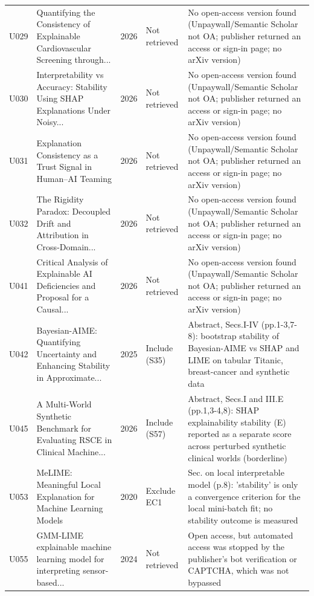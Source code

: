 \begin{longtable}{@{}P{1.0cm}P{6.3cm}P{0.7cm}P{1.6cm}P{6.1cm}@{}}
U029 & Quantifying the Consistency of Explainable Cardiovascular Screening through... & 2026 & Not retrieved & No open-access version found (Unpaywall/\allowbreak{}Semantic Scholar not OA; publisher returned an access or sign-in page; no arXiv version) \\
U030 & Interpretability vs Accuracy: Stability Using SHAP Explanations Under Noisy... & 2026 & Not retrieved & No open-access version found (Unpaywall/\allowbreak{}Semantic Scholar not OA; publisher returned an access or sign-in page; no arXiv version) \\
U031 & Explanation Consistency as a Trust Signal in Human--AI Teaming & 2026 & Not retrieved & No open-access version found (Unpaywall/\allowbreak{}Semantic Scholar not OA; publisher returned an access or sign-in page; no arXiv version) \\
U032 & The Rigidity Paradox: Decoupled Drift and Attribution in Cross-Domain... & 2026 & Not retrieved & No open-access version found (Unpaywall/\allowbreak{}Semantic Scholar not OA; publisher returned an access or sign-in page; no arXiv version) \\
U041 & Critical Analysis of Explainable AI Deficiencies and Proposal for a Causal... & 2026 & Not retrieved & No open-access version found (Unpaywall/\allowbreak{}Semantic Scholar not OA; publisher returned an access or sign-in page; no arXiv version) \\
U042 & Bayesian-AIME: Quantifying Uncertainty and Enhancing Stability in Approximate... & 2025 & Include (S35) & Abstract, Secs.I-IV (pp.1-3,7-8): bootstrap stability of Bayesian-AIME vs SHAP and LIME on tabular Titanic, breast-cancer and synthetic data \\
U045 & A Multi-World Synthetic Benchmark for Evaluating RSCE in Clinical Machine... & 2026 & Include (S57) & Abstract, Secs.I and III.E (pp.1,3-4,8): SHAP explainability stability (E) reported as a separate score across perturbed synthetic clinical worlds (borderline) \\
U053 & MeLIME: Meaningful Local Explanation for Machine Learning Models & 2020 & Exclude EC1 & Sec. on local interpretable model (p.8): 'stability' is only a convergence criterion for the local mini-batch fit; no stability outcome is measured \\
U055 & GMM-LIME explainable machine learning model for interpreting sensor-based... & 2024 & Not retrieved & Open access, but automated access was stopped by the publisher's bot verification or CAPTCHA, which was not bypassed \\

\end{longtable}
